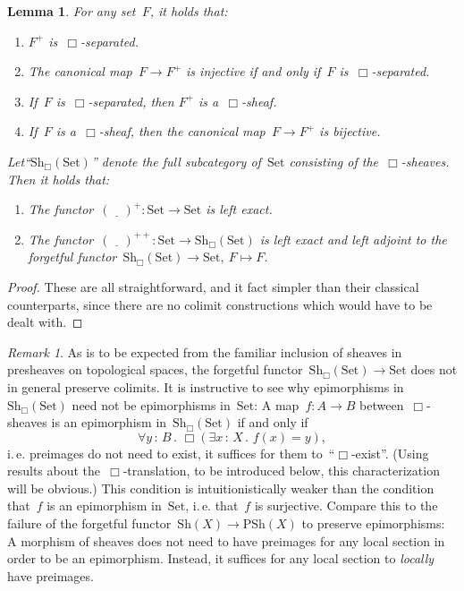\documentclass[10pt]{amsart}
\makeatletter
\theoremstyle{definition}
\theoremstyle{plain}
\newtheorem{lemma}[defn]{Lemma}
\theoremstyle{remark}
\newtheorem{rem}[defn]{Remark}
\newcommand{\placeholder}{\underline{\quad}}
\newcommand{\Set}{\mathrm{Set}}
\newcommand{\Sh}{\mathrm{Sh}}
\newcommand{\PSh}{\mathrm{PSh}}
\newcommand{\?}{\,{:}\,}
\renewcommand{\_}{\mathpunct{.}\,}
\newcommand{\ie}{i.\,e.\@\xspace}
\makeatother
\begin{document}
\begin{lemma}For any set~$F$, it holds that: \begin{enumerate}
\item $F^+$ is~$\Box$-separated.
\item The canonical map~$F \to F^+$ is injective if and only if~$F$
is~$\Box$-separated.
\item If~$F$ is~$\Box$-separated, then $F^+$ is a~$\Box$-sheaf.
\item If~$F$ is a~$\Box$-sheaf, then the canonical map~$F \to F^+$ is bijective.
\end{enumerate}
Let``$\Sh_\Box(\Set)$'' denote the full subcategory of~$\Set$ consisting of
the~$\Box$-sheaves. Then it holds that:
\begin{enumerate}
\addtocounter{enumi}{4}
\item The functor~$(\placeholder)^+ : \Set \to \Set$ is left exact.
\item The functor~$(\placeholder)^{++} : \Set \to \Sh_\Box(\Set)$ is left exact and left
adjoint to the forgetful functor~$\Sh_\Box(\Set) \to \Set,\ F \mapsto F$.
\end{enumerate}\end{lemma}
\begin{proof}These are all straightforward, and it fact simpler than their
classical counterparts, since there are no colimit constructions which would have to
be dealt with.
\end{proof}

\begin{rem}\label{rem:epi-in-box-sheaves}
As is to be expected from the familiar inclusion of sheaves in
presheaves on topological spaces, the forgetful functor~$\Sh_\Box(\Set) \to \Set$
does not in general preserve colimits. It is instructive to see why
epimorphisms in~$\Sh_\Box(\Set)$ need not be epimorphisms in~$\Set$: A map~$f:A
\to B$ between~$\Box$-sheaves is an epimorphism in~$\Sh_\Box(\Set)$ if and only
if
\[ \forall y\?B\_ \Box(\exists x\?X\_ f(x) = y), \]
\ie preimages do not need to exist, it suffices for them to~``$\Box$-exist''.
(Using results about the~$\Box$-translation, to be introduced below, this
characterization will be obvious.) This condition is intuitionistically weaker
than the condition that~$f$ is an epimorphism in~$\Set$, \ie that~$f$ is
surjective. Compare this to the failure of the forgetful functor~$\Sh(X)
\to \PSh(X)$ to preserve epimorphisms: A morphism of sheaves does not need to
have preimages for any local section in order to be an epimorphism. Instead, it
suffices for any local section to \emph{locally} have preimages.\end{rem}
\end{document}
